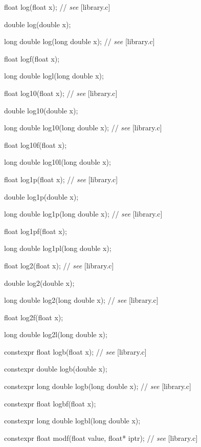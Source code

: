 \documentclass[prd,twocolumn,amsmath,amssymb,nofootinbib,eqsecnum]{revtex4-1}
\newcommand{\highlight}[1]{{\color{red} #1}}
\newcommand{\stdcomment}[1]{{// {\it see} [#1]}}
\begin{document}
{\vspace{2ex}

float log(float x); \stdcomment{library.c}

double log(double x);

long double log(long double x); \stdcomment{library.c}

float logf(float x);

long double logl(long double x);

\vspace{2ex}

float log10(float x); \stdcomment{library.c}

double log10(double x);

long double log10(long double x); \stdcomment{library.c}

float log10f(float x);

long double log10l(long double x);

\vspace{2ex}

float log1p(float x); \stdcomment{library.c}

double log1p(double x);

long double log1p(long double x); \stdcomment{library.c}

float log1pf(float x);

long double log1pl(long double x);

\vspace{2ex}

float log2(float x); \stdcomment{library.c}

double log2(double x);

long double log2(long double x); \stdcomment{library.c}

float log2f(float x);

long double log2l(long double x);

\vspace{2ex}

\highlight{constexpr} float logb(float x); \stdcomment{library.c}

\highlight{constexpr} double logb(double x);

\highlight{constexpr} long double logb(long double x); \stdcomment{library.c}

\highlight{constexpr} float logbf(float x);

\highlight{constexpr} long double logbl(long double x);

\vspace{2ex}

\highlight{constexpr}  float modf(float value, float* iptr); \stdcomment{library.c}

}
\end{document}
